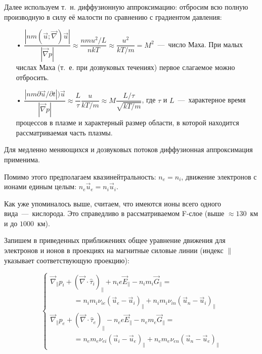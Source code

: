 \documentclass[12pt, a5paper, fleqn, twoside]{article}
\theoremstyle{definiton}
\theoremstyle{definition}
\begin{document}
\bigskip

Далее используем т.~н. диффузионную аппроксимацию: отбросим всю полную производную в силу её малости по сравнению с градиентом давления:

\begin{itemize}

\item[•] $\dfrac{|nm(\vec{u}; \vec{\nabla})\vec{u}|}{|\vec{\nabla}p|}\approx \dfrac{nmu^2/L}{nkT}\approx \dfrac{u^2}{kT/m}=M^2$~---~число Маха. При малых числах Маха (т.~е. при дозвуковых течениях) первое слагаемое можно отбросить.

\item[•] $\dfrac{|nm\partial\vec{u}/\partial t|)\vec{u}}{|\vec{\nabla}p|}\approx \dfrac{L}{\tau} \dfrac{u}{kT/m}\approx M\dfrac{L/\tau}{\sqrt{kT/m}}$, где $\tau$ и $L$~---~характерное время процессов в плазме и характерный размер области, в которой находится рассматриваемая часть плазмы.

\end{itemize}

Для медленно меняющихся и дозвуковых потоков диффузионная аппроксимация применима.

\bigskip

Помимо этого предполагаем квазинейтральность: $n_e=n_i$, движение электронов с ионами единым целым: $n_e \vec{u}_e=n_i \vec{u}_i$. 

Как уже упоминалось выше, считаем, что имеются ионы всего одного вида~---~кислорода. Это справедливо в рассматриваемом F-слое (выше $\approx 130$~км и до $1000$~км).

Запишем в приведенных приближениях общее уравнение движения для электронов и ионов в проекциях на магнитные силовые линии (индекс $\parallel$ указывает соответствующую проекцию):

$$\begin{cases}
\vec{\nabla}_\parallel p_i + (\vec{\nabla}\cdot \hat{\tau}_i)_\parallel + n_ie\vec{E}_\parallel-n_im_i\vec{G}_\parallel=\\
\textrm{ }\textrm{ }\textrm{ }\textrm{ }\textrm{ }=n_im_i\nu_{ie}(\vec{u}_e-\vec{u}_i)_\parallel+n_im_i\nu_{in}(\vec{u}_n-\vec{u}_i)_\parallel\\
\vec{\nabla}_\parallel p_e + (\vec{\nabla}\cdot \hat{\tau}_e)_\parallel - n_ee\vec{E}_\parallel-n_em_e\vec{G}_\parallel=\\
\textrm{ }\textrm{ }\textrm{ }\textrm{ }\textrm{ }=n_em_e\nu_{ei}(\vec{u}_i-\vec{u}_e)_\parallel+n_em_e\nu_{en}(\vec{u}_n-\vec{u}_e)_\parallel
\end{cases}$$
\end{document}

